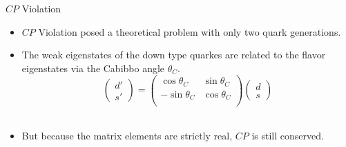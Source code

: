 \documentclass{beamer}
\begin{document}
\begin{frame}{$CP$ Violation}
  \begin{itemize}
    \item $CP$ Violation posed a theoretical problem with only two quark generations.
    \pause\
    \item The weak eigenstates of the down type quarkes are related to the flavor eigenstates via the Cabibbo angle $\theta_C$.
      \begin{equation*}
        \begin{pmatrix} d' \\ s' \end{pmatrix} =
        \begin{pmatrix}
          \cos\theta_C & \sin\theta_C \\
          -\sin\theta_C & \cos\theta_C \\
        \end{pmatrix}
        \begin{pmatrix} d \\ s \end{pmatrix}
      \end{equation*}
    \pause\
    \item But because the matrix elements are strictly real, $CP$ is still conserved.
  \end{itemize}
\end{frame}
\end{document}
